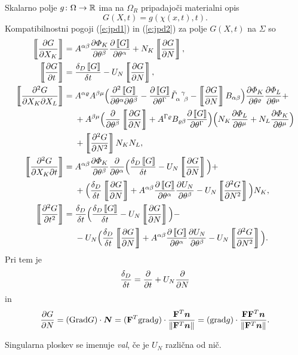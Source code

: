 Skalarno polje $g\colon\Omega\to\mathbb R$ ima na $\Omega_R$ pripadajoči materialni opis
\[ G(X,t)=g(\chi(x,t),t). \]
Kompatibilnostni pogoji (\ref{e:jpd1}) in (\ref{e:jpd2}) za polje $G(X,t)$ na $\Sigma$ so
\begin{align}
	\jump{\frac{\partial G}{\partial X_K}}=\;&
	A^{\alpha\beta}\frac{\partial\varPhi_K}{\partial\theta^{\beta}}
	\frac{\partial \jump{G}}{\partial\theta^{\alpha}}+
	N_K\jump{\frac{\partial G}{\partial N}},\nonumber\\
	\jump{\frac{\partial G}{\partial t}}=\;&
	\frac{\gdtd \jump{G}}{\dtd t}-U_N\jump{\frac{\partial G}{\partial N}},\nonumber\\
	\jump{\frac{\partial^2 G}{\partial X_K\partial X_L}}=\;&
	A^{\alpha\varrho}A^{\beta\mu}\Big( \frac{\partial^2\jump{G}}{\partial\theta^{\alpha}\partial\theta^{\beta}}-
	\frac{\partial\jump{G}}{\partial\theta^{\Gamma}}\tics{\alpha}{\gamma}{\beta}-
	\jump{\frac{\partial G}{\partial N}}B_{\alpha\beta}\Big)
	\frac{\partial\varPhi_K}{\partial\theta^{\varrho}}\frac{\partial\varPhi_L}{\partial\theta^{\mu}}+ \nonumber \\
	&+A^{\beta\mu}\Big(\frac{\partial}{\partial\theta^{\beta}}\jump{\frac{\partial G}{\partial N}}+
	A^{\Gamma\varrho}B_{\varrho\beta}\frac{\partial\jump{G}}{\partial\theta^{\Gamma}}\Big)
	\Big(N_K\frac{\partial\varPhi_L}{\partial\theta^{\mu}}+N_L\frac{\partial\varPhi_K}{\partial\theta^{\mu}}\Big)
	\nonumber\\&+\jump{\frac{\partial^2 G}{\partial N^2}}N_K N_L,\nonumber\\
	\jump{\frac{\partial^2 G}{\partial X_K\partial t}}=\;&
	A^{\alpha\beta}\frac{\partial\varPhi_K}{\partial\theta^{\beta}}
	\frac{\partial}{\partial\theta^{\alpha}}
	\Big(\frac{\gdtd \jump{G}}{\dtd t}-U_N\jump{\frac{\partial G}{\partial N}}\Big)+ \nonumber \\
	&+\Big(\frac{\gdtd}{\dtd t}\jump{\frac{\partial G}{\partial N}}+
	A^{\alpha\beta}\frac{\partial\jump{G}}{\partial\theta^{\alpha}}
	\frac{\partial U_N}{\partial\theta^{\beta}}-U_N\jump{\frac{\partial^2 G}{\partial N^2}}\Big)N_K,\nonumber\\
	\jump{\frac{\partial^2 G}{\partial t^2}}=\;&
	\frac{\gdtd}{\dtd t}\Big(\frac{\gdtd \jump{G}}{\dtd t}-U_N\jump{\frac{\partial G}{\partial N}}\Big)- \nonumber \\
	&-U_N\Big(\frac{\gdtd}{\dtd t}\jump{\frac{\partial G}{\partial N}}+
	A^{\alpha\beta}\frac{\partial\jump{G}}{\partial\theta^{\alpha}}
	\frac{\partial U_N}{\partial\theta^{\beta}}-U_N\jump{\frac{\partial^2 G}{\partial N^2}}\Big).
\end{align}
Pri tem je
\[
	\frac{\delta_D}{\delta t}=\frac{\partial}{\partial t}+U_N\frac{\partial}{\partial N}
\]
in
\[
	\frac{\partial G}{\partial N}=(\mathrm{Grad} G)\cdot\boldsymbol N=
	(\mathbf F^{T}\mathrm{grad} g)\cdot\frac{\mathbf F^{T}\boldsymbol n}{\|\mathbf F^{T}\boldsymbol n\|}=
	(\mathrm{grad} g)\cdot\frac{\mathbf F\mathbf F^{T}\boldsymbol n}{\|\mathbf F^{T}\boldsymbol n\|}.
\]

Singularna ploskev se imenuje \emph{val}, če je $U_N$ različna od nič.